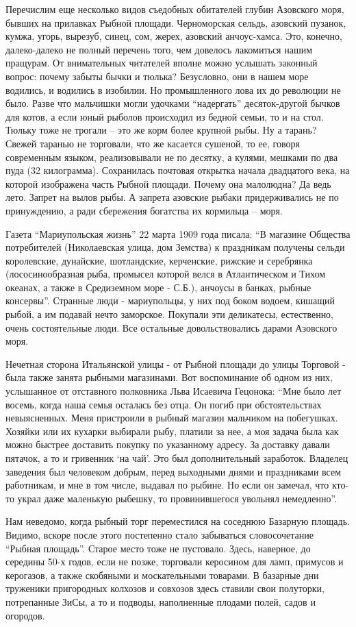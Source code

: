 Перечислим еще несколько видов съедобных обитателей глубин Азовского моря,
бывших на прилавках Рыбной площади. Черноморская сельдь, азовский пузанок,
кумжа, угорь, вырезуб, синец, сом, жерех, азовский анчоус-хамса. Это, конечно,
далеко-далеко не полный перечень того, чем довелось лакомиться нашим пращурам.
От внимательных читателей вполне можно услышать законный вопрос: почему забыты
бычки и тюлька? Безусловно, они в нашем море водились, и водились в изобилии.
Но промышленного лова их до революции не было. Разве что мальчишки могли
удочками \enquote{надергать} десяток-другой бычков для котов, а если юный рыболов
происходил из бедной семьи, то и на стол. Тюльку тоже не трогали – это же корм
более крупной рыбы. Ну а тарань? Свежей таранью не торговали, что же касается
сушеной, то ее, говоря современным языком,  реализовывали не по десятку, а
кулями, мешками по два пуда (32 килограмма). Сохранилась почтовая открытка
начала двадцатого века, на которой изображена часть Рыбной площади. Почему она
малолюдна? Да ведь лето.  Запрет на вылов рыбы. А запрета азовские рыбаки
придерживались не по принуждению, а ради сбережения богатства их кормильца –
моря.

Газета \enquote{Мариупольская жизнь} 22 марта 1909 года писала: \enquote{В магазине Общества
потребителей (Николаевская улица, дом Земства) к праздникам получены сельди
королевские, дунайские, шотландские, керченские, рижские и серебрянка
(лососинообразная рыба, промысел которой велся в Атлантическом и Тихом океанах,
а также в Средиземном море  - С.Б.), анчоусы в банках, рыбные консервы}.
Странные люди - мариупольцы, у них под боком водоем, кишащий рыбой, а им
подавай нечто заморское. Покупали эти деликатесы, естественно, очень
состоятельные люди. Все остальные довольствовались дарами Азовского моря.

Нечетная сторона Итальянской улицы - от Рыбной площади до улицы Торговой - была
также занята рыбными магазинами. Вот воспоминание об одном из них, услышанное
от отставного полковника Льва Исаевича Гецонока: \enquote{Мне было лет восемь, когда
наша семья осталась без отца. Он погиб при обстоятельствах невыясненных. Меня
пристроили в рыбный магазин мальчиком на побегушках. Хозяйки или их кухарки
выбирали рыбу, платили за нее, а моя задача была как можно быстрее доставить
покупку по указанному адресу. За доставку давали пятачок, а то и гривенник \enquote{на
чай}. Это был дополнительный заработок.  Владелец заведения был человеком
добрым, перед выходными днями и праздниками всем работникам, и мне в том числе,
выдавал по рыбине. Но если он замечал, что кто-то украл даже маленькую рыбешку,
то провинившегося увольнял немедленно}.

Нам неведомо, когда рыбный торг переместился на соседнюю Базарную площадь.
Видимо, вскоре после этого постепенно стало забываться словосочетание \enquote{Рыбная
площадь}. Старое место тоже не пустовало. Здесь, наверное, до середины 50-х
годов, если не позже, торговали керосином для ламп, примусов и керогазов, а
также скобяными и москательными товарами. В базарные дни труженики пригородных
колхозов и совхозов здесь ставили свои полуторки, потрепанные ЗиСы, а то и
подводы, наполненные плодами полей, садов и огородов.
